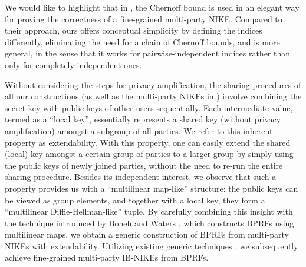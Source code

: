We would like to highlight that in \cite{EC:ACMS23}, the Chernoff bound is used in an elegant way for proving the correctness of a fine-grained multi-party NIKE. Compared to their approach, ours offers conceptual simplicity by defining the indices differently, eliminating the need for a chain of Chernoff bounds, and is more general, in the sense that it works for pairwise-independent indices rather than only for completely independent ones.

Without considering the steps for privacy amplification, the sharing procedures of all our constructions (as well as the multi-party NIKEs in \cite{EC:ACMS23}) involve combining the secret key with public keys of other users sequentially. Each intermediate value, termed as a ``local key'', essentially represents a shared key (without privacy amplification) amongst a subgroup of all parties. We refer to this inherent property as extendability. With this property, one can easily extend the shared (local) key amongst a certain group of parties to a larger group by simply using the public keys of newly joined parties, without the need to re-run the entire sharing procedure. Besides its independent interest, we observe that such a property provides us with a ``multilinear map-like'' structure: the public keys can be viewed as group elements, and together with a local key, they form a ``multilinear Diffie-Hellman-like'' tuple. By carefully combining this insight with the technique introduced by Boneh and Waters \cite{AC:BonWat13}, which constructs BPRFs using multilinear maps, we obtain a generic construction of BPRFs from multi-party NIKEs with extendability. Utilizing existing generic techniques \cite{AC:BonWat13,HKKW13}, we subsequently achieve fine-grained multi-party IB-NIKEs from BPRFs.

